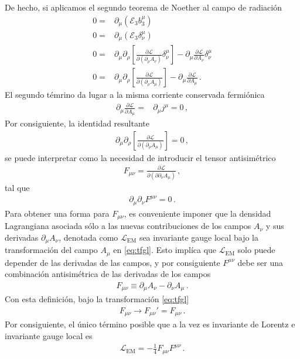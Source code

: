 De hecho, si aplicamos el segundo teorema de Noether al campo de radiación
\begin{align}
  0=&\partial_{\mu} \left( \mathcal{E}_3 b^{\mu}_3 \right) \nonumber\\
   0=&\partial_{\mu} \left( \mathcal{E}_3 \delta^{\mu}_\nu \right) \nonumber\\
   0=&
 \partial_{\mu} \partial_{\rho} \left[ \frac{\partial \mathcal{L}}{\partial \left(  \partial_{\rho} A_{\nu}\right)}  \delta^{\mu}_\nu \right] - \partial_{\mu} \frac{\partial \mathcal{L}}{\partial A_{\nu}}\delta^{\mu}_{\nu} \nonumber\\
   0=&
 \partial_{\mu} \partial_{\rho}\left[ \frac{\partial \mathcal{L}}{\partial \left(  \partial_{\rho} A_{\mu}\right)}  \right] - \partial_{\mu} \frac{\partial \mathcal{L}}{\partial A_{\mu}} \,.
\end{align}
El segundo témrino da lugar a la misma corriente conservada fermiónica
\begin{align}
  \partial_{\mu} \frac{\partial \mathcal{L}}{\partial A_{\mu}}=&
\partial_{\mu} j^{\mu}=0\,,
\end{align}
Por consiguiente, la identidad resultante
\begin{align}
   \partial_{\mu} \partial_{\rho}\left[ \frac{\partial \mathcal{L}}{\partial \left(  \partial_{\rho} A_{\mu}\right)}  \right]=0\,,
\end{align}
se puede interpretar como la necesidad de introducir el tensor antisimétrico
\begin{align}
  F_{\mu\nu}=\frac{\partial \mathcal{L}}{\partial \left(\partial  \partial_{\nu} A_{\mu}\right)}\,,
\end{align}
tal que
\begin{align}
  \partial_{\mu}\partial_{\nu}F^{\mu\nu}=0\,.
\end{align}
Para obtener una forma para $F_{\mu\nu}$, es conveniente imponer que la densidad Lagrangiana asociada sólo a las nuevas contribuciones de los campos $A_{\nu}$ y sus derivadas $\partial_{\mu}A_{\nu}$, denotada como $\mathcal{L}_{\text{EM}}$ 
sea invariante gauge local bajo la transformación del campo $A_{\mu}$ en \eqref{eq:tfgl}. Esto implíca que $\mathcal{L}_{\text{EM}}$  solo puede depender de las derivadas de las campos, y por consiguiente $F^{\mu\nu}$ debe ser una combinación antisimétrica de las derivadas de los campos
\begin{align}
  F_{\mu\nu}\equiv\partial_{\mu}A_{\nu}-\partial_{\nu}A_{\mu}\,.
\end{align}
Con esta definición, bajo la transformación  \eqref{eq:tfgl}
\begin{align}
  F_{\mu\nu}\to F_{\mu\nu}'=F_{\mu\nu}\,.
\end{align}
Por consiguiente, el único término posible que a la vez es invariante de Lorentz e invariante gauge local es
\begin{align}
  \mathcal{L}_{\text{EM}}=-\frac{1}{4}F_{\mu\nu}F^{\mu\nu}\,.
\end{align}


